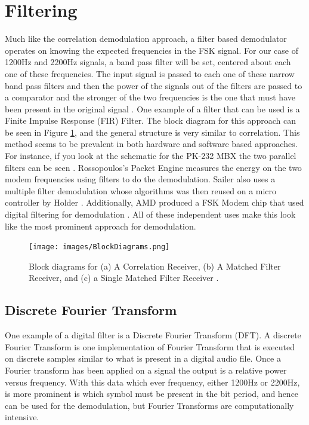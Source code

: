 \section{Filtering}
Much like the correlation demodulation approach, a filter based demodulator operates on knowing the expected frequencies in the FSK signal. For our case of 1200Hz and 2200Hz signals, a band pass filter will be set, centered about each one of these frequencies. The input signal is passed to each one of these narrow band pass filters and then the power of the signals out of the filters are passed to a comparator and the stronger of the two frequencies is the one that must have been present in the original signal \cite{Watson1980}. One example of a filter that can be used is a Finite Impulse Response (FIR) Filter. The block diagram for this approach can be seen in Figure \ref{BlockDiagrams}, and the general structure is very similar to correlation. This method seems to be prevalent in both hardware and software based approaches. For instance, if you look at the schematic for the PK-232 MBX the two parallel filters can be seen \cite{Inc.2001}. Rossopoulos's Packet Engine measures the energy on the two modem frequencies using filters to do the demodulation. Sailer also uses a multiple filter demodulation \cite{Sailer1995} whose algorithms was then reused on a micro controller by Holder \cite{Holder2012}. Additionally, AMD produced a FSK Modem chip that used digital filtering for demodulation \cite{Devices1989}. All of these independent uses make this look like the most prominent approach for demodulation. 

\begin{figure}
  \centering
	\texttt{[image: images/BlockDiagrams.png]} 
	\caption{Block diagrams for (a) A Correlation Receiver, (b) A Matched Filter Receiver, and (c) a Single Matched Filter Receiver \cite{J.Das1986}.}
   \label{BlockDiagrams}
\end{figure}

\subsection{Discrete Fourier Transform}
One example of a digital filter is a Discrete Fourier Transform (DFT). A discrete Fourier Transform is one implementation of Fourier Transform that is executed on discrete samples similar to what is present in a digital audio file. Once a Fourier transform has been applied on a signal the output is a relative power versus frequency. With this data which ever frequency, either 1200Hz or 2200Hz, is more prominent is which symbol must be present in the bit period, and hence can be used for the demodulation, but Fourier Transforms are computationally intensive.


